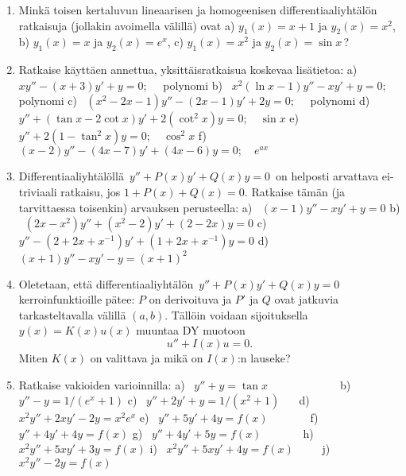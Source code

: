 \Harj
\begin{enumerate}

\item
Minkä toisen kertaluvun lineaarisen ja homogeenisen differentiaaliyhtälön ratkaisuja
(jollakin avoimella välillä) ovat
a) $y_1(x)=x+1$ ja $y_2(x)=x^2$, b) $y_1(x)=x$ ja $y_2(x)=e^x$, c) $y_1(x)=x^2$ ja 
$y_2(x)=\sin x\,$?

\item
Ratkaise käyttäen annettua, yksittäisratkaisua koskevaa lisätietoa: \vspace{1mm}\newline
a) \ $xy''-(x+3)y'+y=0; \quad$ polynomi \newline
b) \ $x^2(\ln x-1)y''-xy'+y=0; \quad$ polynomi \newline
c) \ $(x^2-2x-1)y''-(2x-1)y'+2y=0; \quad$ polynomi \newline
d) \ $ y''+(\tan x-2\cot x)y'+2(\cot^2x)y=0; \quad \sin x$ \newline
e) \ $y''+2(1-\tan^2x)y=0; \quad \cos^2x$ \newline
f) \ $(x-2)y''-(4x-7)y'+(4x-6)y=0; \quad e^{ax}$

\item
Differentiaaliyhtälöllä $\,y''+P(x)y'+Q(x)y=0\,$ on helposti arvattava ei-triviaali ratkaisu,
jos $1+P(x)+Q(x)=0$. Ratkaise tämän (ja tarvittaessa toisenkin) arvauksen perusteella:
\vspace{1mm}\newline
a) \ $(x-1)y''-xy'+y=0$ \newline
b) \ $(2x-x^2)y''+(x^2-2)y'+(2-2x)y=0$ \newline
c) \ $y''-(2+2x+x^{-1})y'+(1+2x+x^{-1})y=0$ \newline
d) \ $(x+1)y''-xy'-y=(x+1)^2$ 

\item
Oletetaan, että differentiaaliyhtälön $\,y''+P(x)y'+Q(x)y=0\,$ kerroinfunktioille pätee:
$P$ on derivoituva ja $P'$ ja $Q$ ovat jatkuvia tarkasteltavalla välillä $(a,b)$. Tällöin
voidaan sijoituksella $y(x)=K(x)u(x)$ muuntaa DY muotoon
\[
u''+I(x)u=0.
\]
Miten $K(x)$ on valittava ja mikä on $I(x)$:n lauseke?

\item
Ratkaise vakioiden varioinnilla:
\vspace{1mm}\newline
a) \ $y''+y=\tan x \qquad\qquad\qquad\,$
b) \ $y''-y=1/(e^x+1)$ \newline
c) \ $y''+2y'+y=1/(x^2+1) \quad\,\ $
d) \ $x^2y''+2xy'-2y=x^2e^x$ \newline
e) \ $y''+5y'+4y=f(x) \qquad\quad\ \ $
f) \ $y''+4y'+4y=f(x)$ \newline
g) \ $y''+4y'+5y=f(x) \qquad\quad\,\ $
h) \ $x^2y''+5xy'+3y=f(x)$ \newline
i) \ $x^2y''+5xy'+4y=f(x) \qquad\ $
j) \ $x^2y''-2y=f(x)$


\end{enumerate}
